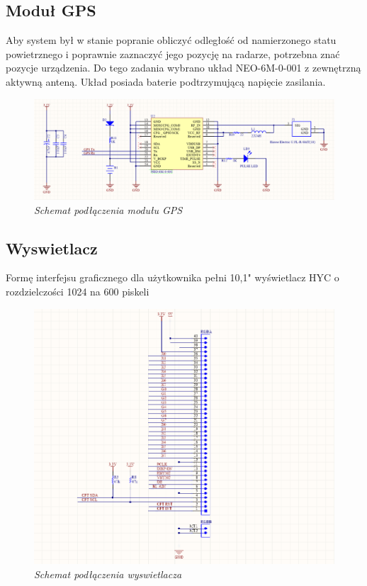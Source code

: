 \documentclass[eng,printmode]{mgr}
\begin{document}
\subsection{Moduł GPS}
Aby system był w stanie popranie obliczyć odległość od namierzonego statu powietrznego i poprawnie zaznaczyć jego pozycję na radarze, potrzebna znać pozycje urządzenia. Do tego zadania wybrano układ NEO-6M-0-001 z zewnętrzną aktywną anteną. Układ posiada baterie podtrzymującą napięcie zasilania.

\begin{figure}[!h]
    \centering
    \includegraphics[width=\textwidth]{schematics/gps.png}
    \caption{\textit{\scriptsize Schemat podłączenia modułu GPS}}
\end{figure}

\subsection{Wyswietlacz}
Formę interfejsu graficznego dla użytkownika pełni 10,1" wyświetlacz HYC o rozdzielczości 1024 na 600 piskeli
\begin{figure}[!h]
    \centering
    \includegraphics[width=\textwidth]{schematics/display.png}
    \caption{\textit{\scriptsize Schemat podłączenia wyswietlacza}}
\end{figure}
\end{document}
